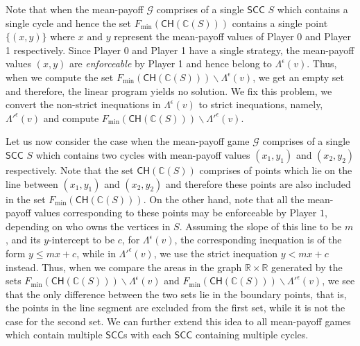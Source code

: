 Note that when the mean-payoff $\mathcal{G}$ comprises of a single $\mathsf{SCC}$ $S$ which contains a single cycle and hence the set $F_{\min}(\mathsf{CH}(\mathbb{C}(S)))$ contains a single point $\{(x, y)\}$ where $x$ and $y$ represent the mean-payoff values of Player 0 and Player 1 respectively. 
Since Player 0 and Player 1 have a single strategy, the mean-payoff values $(x,y)$  are \textit{enforceable} by Player 1 and hence belong to $\Lambda^{\epsilon}(v)$. Thus, when we compute the set $F_{\min}(\mathsf{CH}(\mathbb{C}(S))) \backslash \Lambda^{\epsilon}(v)$, we get an empty set and therefore, the linear program yields no solution. We fix this problem, we convert the non-strict inequations in $\Lambda^{\epsilon}(v)$ to strict inequations, namely, $\Lambda'^{\epsilon}(v)$ and compute $F_{\min}(\mathsf{CH}(\mathbb{C}(S))) \backslash \Lambda'^{\epsilon}(v)$. 

Let us now consider the case when the mean-payoff game $\mathcal{G}$ comprises of a single $\mathsf{SCC}$ $S$ which contains two cycles with mean-payoff values $(x_1, y_1)$ and $(x_2, y_2)$ respectively. Note that the set $\mathsf{CH}(\mathbb{C}(S))$ comprises of points which lie on the line between $(x_1, y_1)$ and $(x_2, y_2)$ and therefore 
these points are also included in the set $F_{\min}(\mathsf{CH}(\mathbb{C}(S)))$.
On the other hand, note that all the mean-payoff values corresponding to these points may be enforceable by Player $1$, depending on who owns the vertices in $S$.
Assuming the slope of this line to be $m$, and its $y$-intercept to be $c$, for $\Lambda^{\epsilon}(v)$, the corresponding inequation is of the form $y \leqslant mx+c$, while in $\Lambda'^{\epsilon}(v)$, we use the strict inequation $y < mx+c$ instead.
Thus, when we compare the areas in the graph $\mathbb{R} \times \mathbb{R}$ generated by the sets $F_{\min}(\mathsf{CH}(\mathbb{C}(S))) \backslash \Lambda^{\epsilon}(v)$ and $F_{\min}(\mathsf{CH}(\mathbb{C}(S))) \backslash \Lambda'^{\epsilon}(v)$, we see that the only difference between the two sets lie in the boundary points, that is, the points in the line segment are excluded from the first set, while it is not the case for the second set.
We can further extend this idea to all mean-payoff games which contain multiple $\mathsf{SCC}$s with each $\mathsf{SCC}$ containing multiple cycles.


